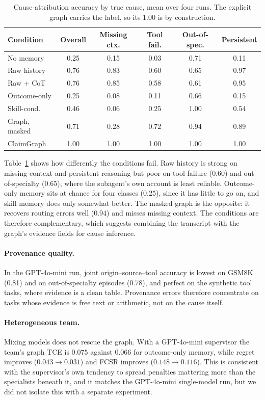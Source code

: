 \documentclass[letterpaper]{article}
\begin{document}
\begin{table}[t]
\centering\scriptsize
\setlength{\tabcolsep}{3pt}
\begin{tabular}{lccccc}
\toprule
Condition & Overall & Missing ctx. & Tool fail. & Out-of-spec. & Persistent\\
\midrule
No memory & 0.25 & 0.15 & 0.03 & 0.71 & 0.11 \\
Raw history & 0.76 & 0.83 & 0.60 & 0.65 & 0.97 \\
Raw + CoT & 0.76 & 0.85 & 0.58 & 0.61 & 0.95 \\
Outcome-only & 0.25 & 0.08 & 0.11 & 0.66 & 0.15 \\
Skill-cond. & 0.46 & 0.06 & 0.25 & 1.00 & 0.54 \\
Graph, masked & 0.71 & 0.28 & 0.72 & 0.94 & 0.89 \\
ClaimGraph & 1.00 & 1.00 & 1.00 & 1.00 & 1.00 \\
\bottomrule
\end{tabular}
\caption{Cause-attribution accuracy by true cause, mean over four runs. The explicit graph carries the label, so its $1.00$ is by construction.}
\label{tab:attr}
\end{table}

Table~\ref{tab:attr} shows how differently the conditions fail. Raw history is strong on missing context and persistent reasoning but poor on tool failure ($0.60$) and out-of-specialty ($0.65$), where the subagent's own account is least reliable. Outcome-only memory sits at chance for four classes ($0.25$), since it has little to go on, and skill memory does only somewhat better. The masked graph is the opposite: it recovers routing errors well ($0.94$) and misses missing context. The conditions are therefore complementary, which suggests combining the transcript with the graph's evidence fields for cause inference.

\paragraph{Provenance quality.}
In the GPT-4o-mini run, joint origin--source--tool accuracy is lowest on GSM8K (0.81) and on out-of-specialty episodes (0.78), and perfect on the synthetic tool tasks, where evidence is a clean table. Provenance errors therefore concentrate on tasks whose evidence is free text or arithmetic, not on the cause itself.

\paragraph{Heterogeneous team.}
Mixing models does not rescue the graph. With a GPT-4o-mini supervisor the team's graph TCE is $0.075$ against $0.066$ for outcome-only memory, while regret improves ($0.043\to0.031$) and FCSR improves ($0.148\to0.116$). This is consistent with the supervisor's own tendency to spread penalties mattering more than the specialists beneath it, and it matches the GPT-4o-mini single-model run, but we did not isolate this with a separate experiment.
\end{document}
